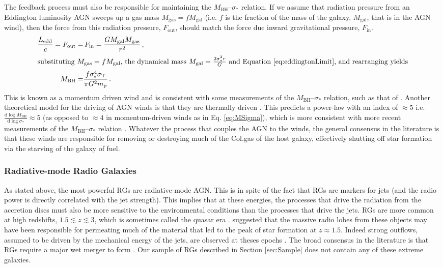			The feedback process must also be responsible for maintaining the $M_\text{BH}$--$\sigma_\ast$ relation. If we assume that radiation pressure from an Eddington luminosity AGN sweeps up a gas mass $M_\text{gas} = f M_\text{gal}$ (i.e. $f$ is the fraction of the mass of the galaxy, $M_\text{gal}$, that is in the AGN wind), then the force from this radiation pressure, $F_\text{out}$, should match the force due inward gravitational pressure, $F_\text{in}$.
			\begin{align}
				\frac{L_\text{edd}}{c} = F_\mathrm{out} = & \, F_\text{in} = \frac{G M_\text{gal} M_\text{gas}}{r^2} \, , \\
				\intertext{substituting $M_\text{gas} = f M_\text{gal}$, the dynamical mass $M_\text{gal} = \frac{2\sigma_\ast^2 r}{G}$ and Equation \ref{eq:eddingtonLimit}, and rearranging yields}
				M_\text{BH} = & \frac{f \sigma_\ast^4 \sigma_\mathrm{T}}{\pi G^2 m_\mathrm{p}} \, .
				\label{eq:MSigma}
			\end{align}
			This is known as a momentum driven wind \citep[e.g.][]{Fabian1999} and is consistent with some measurements of the $M_\text{BH}$--$\sigma_\ast$ relation, such as that of \citet{Gultekin2009}.
			Another theoretical model for the driving of AGN winds is that they are thermally driven \citep{Silk1998}. This predicts a power-law with an index of $\approx 5$ i.e. $\frac{\mathrm{d} \log M_\mathrm{BH}}{\mathrm{d}\log \sigma_\ast} \approx 5$ (as opposed to $\approx 4$ in momentum-driven winds as in Eq. \ref{eq:MSigma}), which is more consistent with more recent measurements of the $M_\mathrm{BH}$--$\sigma_\ast$ relation \citep[e.g.][]{McConnell2013}. 
			Whatever the process that couples the AGN to the winds, the general consensus in the literature is that these winds are responsible for removing or destroying much of the Col.gas of the host galaxy, effectively shutting off star formation via the starving of the galaxy of fuel. 
		\subsubsection{Radiative-mode Radio Galaxies}
			\label{subsubsec:RadiativeRadio}
			As stated above, the most powerful RGs are radiative-mode AGN. This is in spite of the fact that RGs are markers for jets (and the radio power is directly correlated with the jet strength). This implies that at these energies, the processes that drive the radiation from the accretion discs must also be more sensitive to the environmental conditions than the processes that drive the jets. RGs are more common at high redshifts, $1.5 \lesssim z \lesssim 3$, which is sometimes called the quasar era \citep{Miley2008}. \citet{Gopal-Krishna2001} suggested that the massive radio lobes from these objects may have been responsible for permeating much of the material that led to the peak of star formation at $z \approx 1.5$. Indeed strong outflows, assumed to be driven by the mechanical energy of the jets, are observed at theses epochs \citep[e.g.][]{Nesvadba2008, Maiolino2012}.
			The broad consensus in the literature is that RGs require a major wet merger to form \citep[e.g.][]{Malin1983, Quillen1992, Lim2000}. Our sample of RGs described in Section \ref{sec:Sample} does not contain any of these extreme galaxies.
